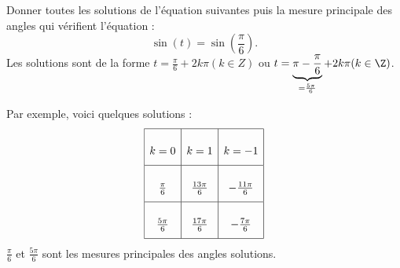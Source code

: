 \documentclass[10pt,openright,twoside,french]{book}
\begin{document}
\begin{Exemple}
    Donner toutes les solutions de l'équation suivantes puis la mesure principale des angles qui vérifient l'équation :
    \[\sin(t) = \sin\left(\frac\pi6\right).\]
    Les solutions sont de la forme $t = \frac\pi6 + 2k\pi (k \in Z)$ ou $t = \underbrace{\pi-\frac\pi6}_{=\frac{5\pi}{6}} + 2k\pi (k \in \Z)$.\par
    Par exemple, voici quelques solutions :
    \[
    \renewcommand\arraystretch{2.75}
    \begin{array}{|c|c|c|}
    \hline
        k = 0 & k = 1 & k = -1\\
    \hline
        \frac\pi6 & \frac{13\pi}{6} & -\frac{11\pi}{6}\\
    \hline
        \frac{5\pi}{6} & \frac{17\pi}{6} & -\frac{7\pi}{6}\\
    \hline
    \end{array}
    \]
    $\frac \pi 6$ et $\frac{5\pi}{6}$ sont les mesures principales des angles solutions.
\end{Exemple}
\end{document}
